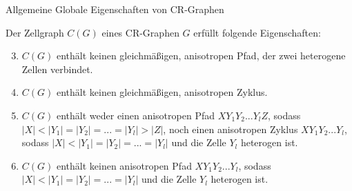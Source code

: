 \documentclass{beamer}
\begin{document}
	\begin{frame}{Allgemeine Globale Eigenschaften von CR-Graphen}
		\begin{Lemma}
			Der Zellgraph $C(G)$ eines CR-Graphen $G$ erfüllt folgende Eigenschaften:
			
			\begin{enumerate}[label=(\Alph*)]
				\setcounter{enumi}{2}
				\item $C(G)$ enthält keinen gleichmäßigen, anisotropen Pfad, der zwei heterogene Zellen verbindet.
				\item $C(G)$ enthält keinen gleichmäßigen, anisotropen Zyklus.
				\item $C(G)$ enthält weder einen anisotropen Pfad $XY_1Y_2...Y_lZ$, sodass $|X|<|Y_1|=|Y_2|=...=|Y_l|>|Z|$, noch einen anisotropen Zyklus $XY_1Y_2...Y_l$, sodass $|X|<|Y_1|=|Y_2|=...=|Y_l|$ und die Zelle $Y_l$ heterogen ist.
				\item $C(G)$ enthält keinen anisotropen Pfad $XY_1Y_2...Y_l$, sodass $|X|<|Y_1|=|Y_2|=...=|Y_l|$ und die Zelle $Y_l$ heterogen ist.
			\end{enumerate}
		\end{Lemma}
	\end{frame}
\end{document}
